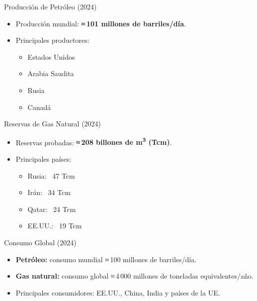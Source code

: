 \documentclass[main.tex]{subfiles}
\begin{document}
\begin{frame}{Producción de Petróleo (2024)}
    \begin{itemize}
        \item Producción mundial: \textbf{≈ 101 millones de barriles/día}.
        \item Principales productores:
        \begin{itemize}
            \item Estados Unidos
            \item Arabia Saudita
            \item Rusia
            \item Canadá
        \end{itemize}
    \end{itemize}
\end{frame}


\begin{frame}{Reservas de Gas Natural (2024)}
    \begin{itemize}
        \item Reservas probadas: \textbf{≈ 208 billones de m\textsuperscript{3} (Tcm)}.
        \item Principales países:
        \begin{itemize}
            \item Rusia: ~47 Tcm
            \item Irán: ~34 Tcm
            \item Qatar: ~24 Tcm
            \item EE.UU.: ~19 Tcm
        \end{itemize}
    \end{itemize}
\end{frame}


\begin{frame}{Consumo Global (2024)}
    \begin{itemize}
        \item \textbf{Petróleo:} consumo mundial ≈ 100 millones de barriles/día.
        \item \textbf{Gas natural:} consumo global ≈ 4 000 millones de toneladas equivalentes/año.
        \item Principales consumidores: EE.UU., China, India y países de la UE.
    \end{itemize}
\end{frame}
\end{document}

